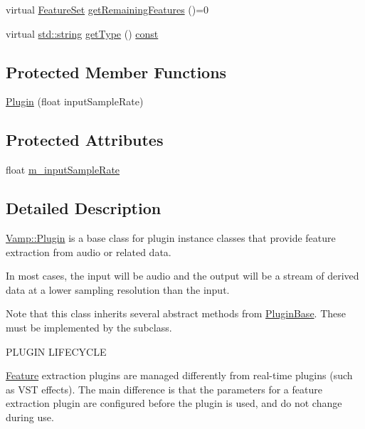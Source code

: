 \begin{DoxyCompactItemize}
\item 
virtual \hyperlink{class_vamp_1_1_plugin_a448fb57dc245d47923ec9eeaf9856c5f}{Feature\+Set} \hyperlink{class_vamp_1_1_plugin_aeca2a26e658ba0314ba90d25dd2195d6}{get\+Remaining\+Features} ()=0
\item 
virtual \hyperlink{test__lib_f_l_a_c_2format_8c_ab02026ad0de9fb6c1b4233deb0a00c75}{std\+::string} \hyperlink{class_vamp_1_1_plugin_abe13b3997a69fbcc09e2213faa352f91}{get\+Type} () \hyperlink{getopt1_8c_a2c212835823e3c54a8ab6d95c652660e}{const} 
\end{DoxyCompactItemize}
\subsection*{Protected Member Functions}
\begin{DoxyCompactItemize}
\item 
\hyperlink{class_vamp_1_1_plugin_a1b78c4f46c72ef345ed27f0b9bf20ac9}{Plugin} (float input\+Sample\+Rate)
\end{DoxyCompactItemize}
\subsection*{Protected Attributes}
\begin{DoxyCompactItemize}
\item 
float \hyperlink{class_vamp_1_1_plugin_a59b9dd82a4f4eb946cd0474cc81abc23}{m\+\_\+input\+Sample\+Rate}
\end{DoxyCompactItemize}


\subsection{Detailed Description}
\hyperlink{class_vamp_1_1_plugin}{Vamp\+::\+Plugin} is a base class for plugin instance classes that provide feature extraction from audio or related data.

In most cases, the input will be audio and the output will be a stream of derived data at a lower sampling resolution than the input.

Note that this class inherits several abstract methods from \hyperlink{class_vamp_1_1_plugin_base}{Plugin\+Base}. These must be implemented by the subclass.

P\+L\+U\+G\+IN L\+I\+F\+E\+C\+Y\+C\+LE

\hyperlink{struct_vamp_1_1_plugin_1_1_feature}{Feature} extraction plugins are managed differently from real-\/time plugins (such as V\+ST effects). The main difference is that the parameters for a feature extraction plugin are configured before the plugin is used, and do not change during use.


